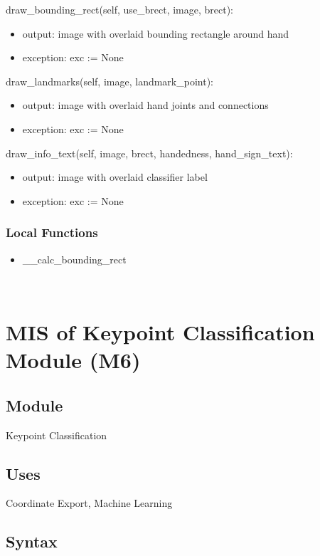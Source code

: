 \documentclass[12pt, titlepage]{article}
\begin{document}
\noindent draw\_bounding\_rect(self, use\_brect, image, brect):
\begin{itemize}
\item output: image with overlaid bounding rectangle around hand
\item exception: exc := None
\end{itemize}

\noindent draw\_landmarks(self, image, landmark\_point):
\begin{itemize}
\item output: image with overlaid hand joints and connections
\item exception: exc := None
\end{itemize}

\noindent draw\_info\_text(self, image, brect, handedness, hand\_sign\_text):
\begin{itemize}
\item output:  image with overlaid classifier label
\item exception: exc := None
\end{itemize}

\subsubsection{Local Functions}
\begin{itemize}
\item \_\_calc\_bounding\_rect
\end{itemize}

\newpage
~\newpage

\section{MIS of Keypoint Classification Module (M6)} \label{M6}

\subsection{Module}

Keypoint Classification\\

\subsection{Uses}

Coordinate Export, Machine Learning\\

\subsection{Syntax}
\end{document}
